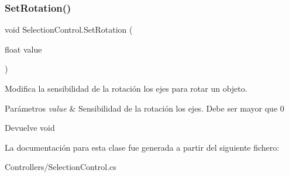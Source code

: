 \subsubsection{\texorpdfstring{SetRotation()}{SetRotation()}}
{\footnotesize\ttfamily void Selection\+Control.\+Set\+Rotation (\begin{DoxyParamCaption}\item[{float}]{value }\end{DoxyParamCaption})\hspace{0.3cm}{\ttfamily [inline]}}

Modifica la sensibilidad de la rotación los ejes para rotar un objeto. 
\begin{DoxyParams}{Parámetros}
{\em value} & Sensibilidad de la rotación los ejes. Debe ser mayor que 0 \\
\hline
\end{DoxyParams}
\begin{DoxyReturn}{Devuelve}
void 
\end{DoxyReturn}


La documentación para esta clase fue generada a partir del siguiente fichero\+:\begin{DoxyCompactItemize}
\item 
Controllers/Selection\+Control.\+cs\end{DoxyCompactItemize}
